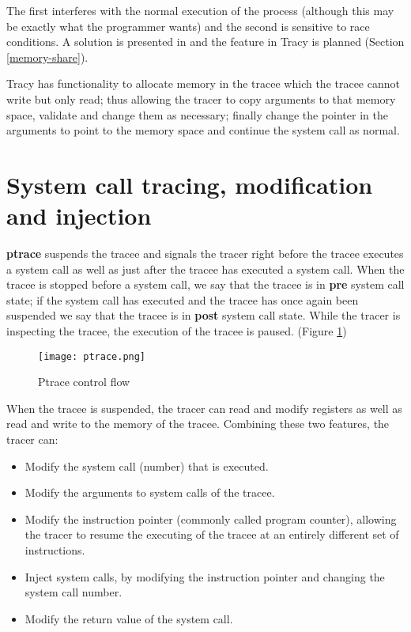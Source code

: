 \documentclass[a4paper, 10pt]{report}
\begin{document}
The first interferes with the normal execution of the process
(although this may be exactly what the programmer wants) and the second is
sensitive to race conditions. A solution is presented in
\cite{Noordende_asecure} and the feature in Tracy is planned (Section
\ref{memory-share}).

Tracy has functionality to allocate memory in the tracee which
the tracee cannot write but only read; thus allowing the tracer
to copy arguments to that memory space, validate and change them as
necessary; finally change the pointer in the arguments to point to the memory
space and continue the system call as normal.

\section{System call tracing, modification and injection}

\textbf{ptrace} suspends the tracee and signals the tracer right before
the tracee executes a system call as well as just after the tracee has
executed a system call. When the tracee is stopped before a system call,
we say that the tracee is in \textbf{pre} system call state; if the system
call has executed and the tracee has once again
been suspended we say that the tracee is in \textbf{post} system call state.
While the tracer is inspecting the tracee, the execution of the
tracee is paused. (Figure \ref{fig1})


\begin{figure}
\texttt{[image: ptrace.png]}
\caption{Ptrace control flow}
\label{fig1}
\end{figure}

When the tracee is suspended, the tracer can read and modify registers as well
as read and write to the memory of the tracee. Combining these two features,
the tracer can:

\begin{itemize}
\item Modify the system call (number) that is executed.
\item Modify the arguments to system calls of the tracee.
\item Modify the instruction pointer (commonly called program counter), allowing
    the tracer to resume the executing of the tracee at an entirely
    different set of instructions.
\item Inject system calls, by modifying the instruction pointer and changing the
    system call number.
\item Modify the return value of the system call.
\end{itemize}
\end{document}

